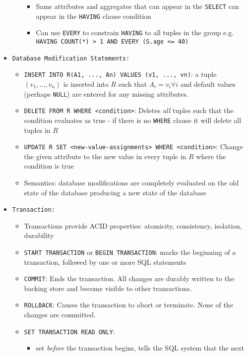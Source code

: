 \documentclass[landscape,8pt]{extarticle}
\newcommand{\code}{\lstinline}
\begin{document}
\begin{multicols}{4}
\begin{itemize}
\begin{itemize}
\begin{itemize}
        \item Same attributes and aggregates that can appear in the \code{SELECT} can appear in the
        \code{HAVING} clause condition
        \item Can use \code{EVERY} to constrain \code{HAVING} to all tuples in the group e.g. \code{HAVING COUNT(*) > 1 AND EVERY (S.age <= 40)}
    \end{itemize}
\end{itemize}
\item \code{Database Modification Statements:}
\begin{itemize}
    \item \code{INSERT INTO R(A1, ..., An) VALUES (v1, ..., vn)}: a tuple $(v_1, \ldots, v_n)$ is
    inserted into $R$ such that $A_i = v_i \forall i$ and default values (perhaps \code{NULL}) are
    entered for any missing attributes.
    \item \code{DELETE FROM R WHERE <condition>}: Deletes \emph{all} tuples such that the condition
    evaluates as true - if there is no \code{WHERE} clause it will delete all tuples in $R$
    \item \code{UPDATE R SET <new-value-assignments> WHERE <condition>}: Change the given attribute
    to the new value in every tuple in $R$ where the condition is true
    \item Semantics: database modifications are completely evaluated on the old state of the
    database producing a new state of the database
\end{itemize}
\item \code{Transaction:}
\begin{itemize}
    \item Transactions provide ACID properties: atomicity, consistency, isolation, durability
    \item \code{START TRANSACTION} or \code{BEGIN TRANSACTION}: marks the beginning of a
    transaction, followed by one or more SQL statements
    \item \code{COMMIT}: Ends the transaction. All changes are durably written to the backing store
    and become visible to other transactions.
    \item \code{ROLLBACK}: Causes the transaction to abort or terminate. None of the changes are committed.
    \item \code{SET TRANSACTION READ ONLY}: 
    \begin{itemize}
        \item set \emph{before} the transaction begins, tells the SQL system that the next

\end{itemize}
\end{itemize}
\end{itemize}
\end{multicols}
\end{document}
